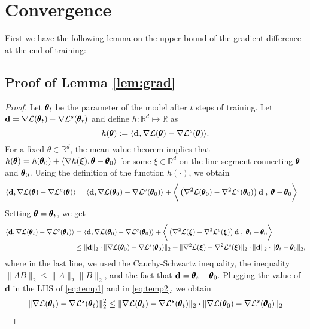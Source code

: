 \newpage
\section{Convergence}
%
%

First we have the following lemma on the upper-bound of the gradient difference at the end of training:
\subsection{Proof of Lemma \ref{lem:grad}}
\begin{proof}
Let $\pmb{\theta}_t$ be the parameter of the model after $t$ steps of training. Let $\mathbf{d}=  \nabla {\mathcal{L}} (\pmb{\theta}_t) -  \nabla {\mathcal{L}}^s (\pmb{\theta}_t)$ and define $h:\mathbb{R}^d \mapsto \mathbb{R}$ as 
\[
h(\pmb{\theta}):= \langle \mathbf{d},\nabla{\mathcal{L}} (\pmb{\theta}) -  \nabla {\mathcal{L}}^s (\pmb{\theta}) \rangle.
\]
For a fixed $\theta\in \mathbb{R}^d$, the mean value theorem implies that $h(\pmb{\theta}) = h(\pmb{\theta}_0) + \langle\nabla h(\boldsymbol{\xi}),\pmb{\theta} - \pmb{\theta}_0\rangle$ for some $\xi\in \mathbb{R}^d$ on the line segment connecting $\pmb{\theta}$ and $\pmb{\theta}_0$. Using the definition of the function $h(\cdot)$, we obtain
\begin{align}
\langle \mathbf{d},\nabla{\mathcal{L}} (\pmb{\theta}) -  \nabla {\mathcal{L}}^s (\pmb{\theta}) \rangle & = \langle \mathbf{d},\nabla{\mathcal{L}} (\pmb{\theta}_0) -  \nabla {\mathcal{L}}^s (\pmb{\theta}_0) \rangle + \bigg\langle \left(\nabla^2{\mathcal{L}} (\pmb{\theta}_0) -  \nabla^2 {\mathcal{L}}^s (\pmb{\theta}_0)\right) \mathbf{d}\;, \; \pmb{\theta} - \pmb{\theta}_0\bigg\rangle\nonumber
\end{align}
Setting $\pmb{\theta} = \pmb{\theta}_t$, we get
\begin{align}
\langle \mathbf{d},\nabla{\mathcal{L}} (\pmb{\theta}_t) -  \nabla {\mathcal{L}}^s (\pmb{\theta}_t) \rangle & = \langle \mathbf{d},\nabla{\mathcal{L}} (\pmb{\theta}_0) -  \nabla {\mathcal{L}}^s (\pmb{\theta}_0) \rangle + \bigg\langle \left(\nabla^2{\mathcal{L}} (\boldsymbol{\xi}) -  \nabla^2 {\mathcal{L}}^s (\boldsymbol{\xi})\right) \mathbf{d}\;, \; \pmb{\theta}_t - \pmb{\theta}_0\bigg\rangle \label{eq:temp1}\\
&\leq \|\mathbf{d}\|_2 \cdot\|\nabla{\mathcal{L}} (\pmb{\theta}_0) -  \nabla {\mathcal{L}}^s (\pmb{\theta}_0) \|_2 + \|\nabla^2{\mathcal{L}} (\boldsymbol{\xi}) -  \nabla^2 {\mathcal{L}}^s (\boldsymbol{\xi})\|_2 \cdot \|\mathbf{d}\|_2 \cdot  \|\pmb{\theta}_t- \pmb{\theta}_0\|_2, \label{eq:temp2}
\end{align}
where in the last line, we used the Cauchy-Schwartz inequality, the inequality $\|AB\|_2 \leq \|A\|_2 \|B\|_2$, and the fact that $\mathbf{d} = \pmb{\theta}_t - \pmb{\theta}_0$. Plugging the value of $\mathbf{d}$ in the LHS of \eqref{eq:temp1} and in \eqref{eq:temp2}, we obtain
\begin{align}
\|\nabla\gL (\thet_t) -  \nabla \gL^s (\thet_t) \|_2^2 &\leq   \|\nabla\gL (\thet_t) -  \nabla \gL^s (\thet_t)\|_2 \cdot\|\nabla\gL (\thet_0) -  \nabla \gL^s (\thet_0) \|_2 \nonumber\\

\end{align}
\end{proof}

